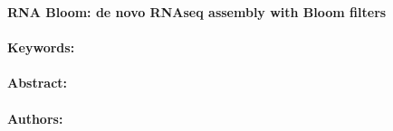 \noindent
\large {\bf RNA Bloom: de novo RNAseq assembly with Bloom filters} 


\normalsize 


\noindent \paragraph{Keywords:} 

\noindent \paragraph{Abstract:} 



\noindent \paragraph{Authors:} 

